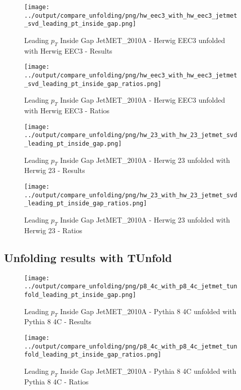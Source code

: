 \documentclass[11pt]{book}
\begin{document}
\begin{figure}[ht]
\centering
\texttt{[image: ../output/compare\_unfolding/png/hw\_eec3\_with\_hw\_eec3\_jetmet\_svd\_leading\_pt\_inside\_gap.png]}
\caption{Leading $p_{T}$ Inside Gap JetMET\_2010A - Herwig EEC3 unfolded with Herwig EEC3 - Results}
\label{hw_eec3_hw_eec3_jetmet_svd_leading_pt_inside_gap_a}
\end{figure}

\begin{figure}[ht]
\centering
\texttt{[image: ../output/compare\_unfolding/png/hw\_eec3\_with\_hw\_eec3\_jetmet\_svd\_leading\_pt\_inside\_gap\_ratios.png]}
\caption{Leading $p_{T}$ Inside Gap JetMET\_2010A - Herwig EEC3 unfolded with Herwig EEC3 - Ratios}
\label{hw_eec3_hw_eec3_jetmet_svd_leading_pt_inside_gap_b}
\end{figure}

\begin{figure}[ht]
\centering
\texttt{[image: ../output/compare\_unfolding/png/hw\_23\_with\_hw\_23\_jetmet\_svd\_leading\_pt\_inside\_gap.png]}
\caption{Leading $p_{T}$ Inside Gap JetMET\_2010A - Herwig 23 unfolded with Herwig 23 - Results}
\label{hw_23_hw_23_jetmet_svd_leading_pt_inside_gap_a}
\end{figure}

\begin{figure}[ht]
\centering
\texttt{[image: ../output/compare\_unfolding/png/hw\_23\_with\_hw\_23\_jetmet\_svd\_leading\_pt\_inside\_gap\_ratios.png]}
\caption{Leading $p_{T}$ Inside Gap JetMET\_2010A - Herwig 23 unfolded with Herwig 23 - Ratios}
\label{hw_23_hw_23_jetmet_svd_leading_pt_inside_gap_b}
\end{figure}


\clearpage
\subsection{Unfolding results with TUnfold}

\begin{figure}[ht]
\centering
\texttt{[image: ../output/compare\_unfolding/png/p8\_4c\_with\_p8\_4c\_jetmet\_tunfold\_leading\_pt\_inside\_gap.png]}
\caption{Leading $p_{T}$ Inside Gap JetMET\_2010A - Pythia 8 4C unfolded with Pythia 8 4C - Results}
\label{p8_p8_jetmet_tunfold_leading_pt_inside_gap_a}
\end{figure}

\begin{figure}[ht]
\centering
\texttt{[image: ../output/compare\_unfolding/png/p8\_4c\_with\_p8\_4c\_jetmet\_tunfold\_leading\_pt\_inside\_gap\_ratios.png]}
\caption{Leading $p_{T}$ Inside Gap JetMET\_2010A - Pythia 8 4C unfolded with Pythia 8 4C - Ratios}
\label{p8_p8_jetmet_tunfold_leading_pt_inside_gap_b}
\end{figure}
\end{document}
